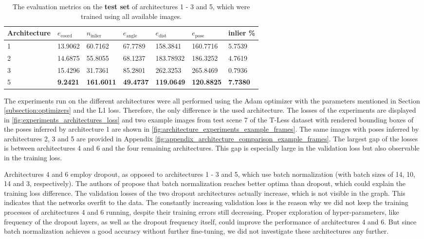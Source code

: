 \begin{table}[b]
\centering
\begin{tabular}{|l||llllll|} \hline
Architecture & $e_{\text{coord}}$ & $n_{\text{inlier}}$ & $e_{\text{angle}}$ & $e_{\text{dist}}$ & $e_{\text{pose}}$ & inlier \% \\ \hline \hline \rowcolor{Gray}
1            & 13.9062            & 60.7162   & 67.7789   & 158.3841           & 160.7716             & 5.7539 \\ \hline
2            & 14.6875            & 55.8055   & 68.1237   & 183.78932          & 186.3252            & 4.7619           \\ \hline \rowcolor{Gray}
3            & 15.4296            & 31.7361   & 85.2801   & 262.3253           & 265.8469           & 0.7936         \\ \hline
5            & \textbf{9.2421}    & \textbf{161.6011}     & \textbf{49.4737}   & \textbf{119.0649}  & \textbf{120.8825} & \textbf{7.7380} \\ \hline       
\end{tabular}
\caption{The evaluation metrics on the \textbf{test set} of architectures 1 - 3 and 5, which were trained using all available images.}
\label{table:architecture_test_metrics_comparison}
\end{table}

The experiments run on the different architectures were all performed using the Adam optimizer with the parameters mentioned in Section \ref{subsection:optimizers} and the L1 loss. Therefore, the only difference is the used architecture. The losses of the experiments are displayed in \fig \ref{fig:experiments_architectures_loss} and two example images from test scene 7 of the T-Less dataset with rendered bounding boxes of the poses inferred by architecture 1 are shown in \fig \ref{fig:architecture_experiments_example_frames}. The same images with poses inferred by architectures 2, 3 and 5 are provided in Appendix \ref{fig:appendix_architecture_comparison_example_frames}. The largest gap of the losses is between architectures 4 and 6 and the four remaining architectures. This gap is especially large in the validation loss but also observable in the training loss. 

Architectures 4 and 6 employ dropout, as opposed to architectures 1 - 3 and 5, which use batch normalization (with batch sizes of 14, 10, 14 and 3, respectively). The authors of \cite{batch_normalization}  propose that batch normalization reaches better optima than dropout, which could explain the training loss difference. The validation losses of the two dropout architectures actually increase, which is not visible in the graph. This indicates that the networks overfit to the data. The constantly increasing validation loss is the reason why we did not keep the training processes of architectures 4 and 6 running, despite their training errors still decreasing. Proper exploration of hyper-parameters, like frequency of the dropout layers, as well as the dropout frequency itself, could improve the performance of architectures 4 and 6. But since batch normalization achieves a good accuracy without further fine-tuning, we did not investigate these architectures any further.

